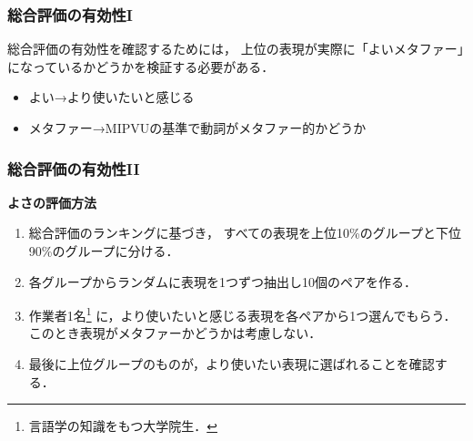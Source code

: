 \documentclass[12pt,usepdftitle=false]{beamer}
\begin{document}
\begin{frame}
    \frametitle{総合評価の有効性I}
    総合評価の有効性を確認するためには，
    上位の表現が実際に「よいメタファー」になっているかどうかを検証する必要がある．

    \begin{itemize}
        \item よい→より使いたいと感じる
        \item メタファー→MIPVUの基準で動詞がメタファー的かどうか
    \end{itemize}

\end{frame}

\begin{frame}
    \frametitle{総合評価の有効性II}
    \textbf{よさの評価方法}
    \begin{enumerate}
        \item 総合評価のランキングに基づき，
              すべての表現を上位10\%のグループと下位90\%のグループに分ける．

        \item 各グループからランダムに表現を1つずつ抽出し10個のペアを作る．

        \item 作業者1名\footnote[frame]{%
            言語学の知識をもつ大学院生．}
            に，より使いたいと感じる表現を各ペアから1つ選んでもらう．
            このとき表現がメタファーかどうかは考慮しない．

        \item 最後に上位グループのものが，より使いたい表現に選ばれることを確認する．

    \end{enumerate}
\end{frame}
\end{document}
